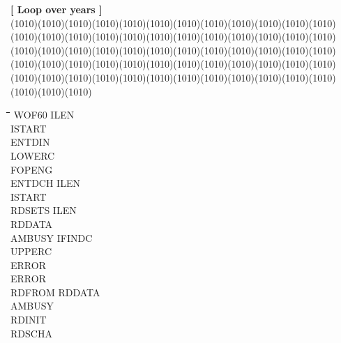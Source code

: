 \documentclass[11pt]{article}
\begin{document}
\bigskip
\strut\hfill {\bf [ Loop over years ]}\\
 \GrBox(1010)\GrBox(1010)\GrBox(1010)\GrBox(1010)\GrBox(1010)\GrBox(1010)\GrBox(1010)\GrBox(1010)\GrBox(1010)\GrBox(1010)\GrBox(1010)\GrBox(1010)\GrBox(1010)\GrBox(1010)\GrBox(1010)\GrBox(1010)\GrBox(1010)\GrBox(1010)\GrBox(1010)\GrBox(1010)\GrBox(1010)\GrBox(1010)\GrBox(1010)\GrBox(1010)\GrBox(1010)\GrBox(1010)\GrBox(1010)\GrBox(1010)\GrBox(1010)\GrBox(1010)\GrBox(1010)\GrBox(1010)\GrBox(1010)\GrBox(1010)\GrBox(1010)\GrBox(1010)\GrBox(1010)\GrBox(1010)\GrBox(1010)\GrBox(1010)\GrBox(1010)\GrBox(1010)\GrBox(1010)\GrBox(1010)\GrBox(1010)\GrBox(1010)\GrBox(1010)\GrBox(1010)\GrBox(1010)\GrBox(1010)\GrBox(1010)\GrBox(1010)\GrBox(1010)\GrBox(1010)\GrBox(1010)\GrBox(1010)\GrBox(1010)\GrBox(1010)\GrBox(1010)\GrBox(1010)\GrBox(1010)\GrBox(1010)\GrBox(1010)\nwln
\begin{tabbing}
\hspace{1.27cm}\=\hspace{1.27cm}\=\hspace{1.27cm}\=\hspace{1.27cm}\=%
\hspace{1.27cm}\=\hspace{1.27cm}\=\hspace{1.27cm}\=\hspace{1.27cm}\=%
\hspace{1.27cm}\=\hspace{1.27cm}\=\kill
\>\> WOF60\> \> ILEN\\
\>\> \> \> ISTART\\
\>\> \> \> ENTDIN\\
\>\> \> \> LOWERC\\
\>\> \> \> FOPENG\\
\>\> \> \> ENTDCH\> \> ILEN\\
\>\> \> \> \> \> ISTART\\
\>\> \> \> RDSETS\> \> ILEN\\
\>\> \> \> \> \> RDDATA\\
\>\> \> \> \> \> AMBUSY\> \> IFINDC\\
\>\> \> \> \> \> \> \> UPPERC\\
\>\> \> \> \> \> \> \> ERROR\\
\>\> \> \> ERROR\\
\>\> \> \> RDFROM\> \> RDDATA\\
\>\> \> \> \> \> AMBUSY\\
\>\> \> \> RDINIT\\
\>\> \> \> RDSCHA\\

\end{tabbing}
\end{document}
